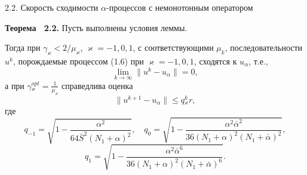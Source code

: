 \documentclass[10pt,pdf, mathserif, hyperref={unicode}]{beamer}
\begin{document}
\begin{frame}{\small 2.2. Скорость сходимости $\alpha$-процессов с немонотонным оператором}
	\begin{block}{\bf Теорема ~2.2.}
		Пусть выполнены условия леммы. 
		
		Тогда при $\gamma_\varkappa<2/\mu _\varkappa$, $\varkappa=-1,0,1$, с соответствующими $\mu _k$, последовательности ${u^k}$, порождаемые процессом (1.6) при $\varkappa=-1,0,1$, сходятся к $u_\alpha$, т.е., $$\lim_{k\to\infty}\|u^k-u_\alpha\|=0,$$ а при $
		\gamma{_\varkappa^{opt}}=\frac{1}{\mu_\varkappa}$
		справедлива оценка $$\|u^{k+1}-u_\alpha\|\leqslant q{_\varkappa^k}r,$$ где
		$$q_{-1}=\sqrt{1-\frac{\alpha^2}{64\bar S^2(N_1+\alpha)^2}}, \quad q_0=\sqrt{1-\frac{\alpha^2\bar\alpha^2}{36(N_1+\alpha)^2(N_1+\bar\alpha)^2}},$$
		$$q_1=\sqrt{1-\frac{\alpha^2\bar\alpha^6}{36(N_1+\alpha)^2(N_1+\bar\alpha)^6}}.$$
	\end{block}
\end{frame}

%		
%		
\end{document}
